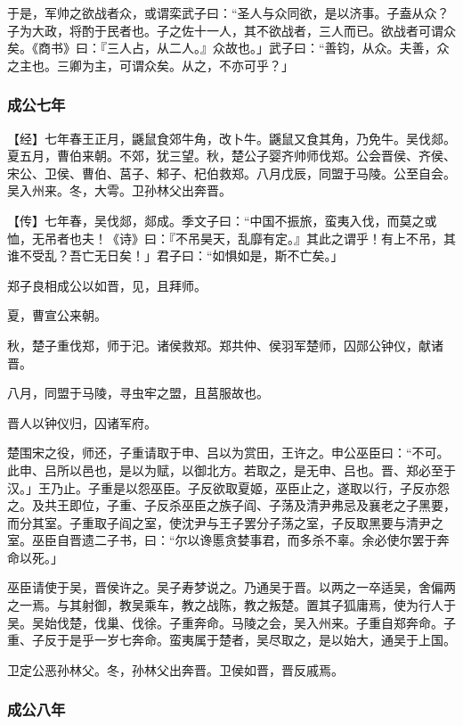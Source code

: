 \documentclass[]{article}
\begin{document}
于是，军帅之欲战者众，或谓栾武子曰：``圣人与众同欲，是以济事。子盍从众？子为大政，将酌于民者也。子之佐十一人，其不欲战者，三人而已。欲战者可谓众矣。《商书》曰：『三人占，从二人。』众故也。」武子曰：``善钧，从众。夫善，众之主也。三卿为主，可谓众矣。从之，不亦可乎？」

\hypertarget{header-n1612}{%
\subsubsection{成公七年 }\label{header-n1612}}

【经】七年春王正月，鼷鼠食郊牛角，改卜牛。鼷鼠又食其角，乃免牛。吴伐郯。夏五月，曹伯来朝。不郊，犹三望。秋，楚公子婴齐帅师伐郑。公会晋侯、齐侯、宋公、卫侯、曹伯、莒子、邾子、杞伯救郑。八月戊辰，同盟于马陵。公至自会。吴入州来。冬，大雩。卫孙林父出奔晋。

【传】七年春，吴伐郯，郯成。季文子曰：``中国不振旅，蛮夷入伐，而莫之或恤，无吊者也夫！《诗》曰：『不吊昊天，乱靡有定。』其此之谓乎！有上不吊，其谁不受乱？吾亡无日矣！」君子曰：``如惧如是，斯不亡矣。」

郑子良相成公以如晋，见，且拜师。

夏，曹宣公来朝。

秋，楚子重伐郑，师于汜。诸侯救郑。郑共仲、侯羽军楚师，囚郧公钟仪，献诸晋。

八月，同盟于马陵，寻虫牢之盟，且莒服故也。

晋人以钟仪归，囚诸军府。

楚围宋之役，师还，子重请取于申、吕以为赏田，王许之。申公巫臣曰：``不可。此申、吕所以邑也，是以为赋，以御北方。若取之，是无申、吕也。晋、郑必至于汉。」王乃止。子重是以怨巫臣。子反欲取夏姬，巫臣止之，遂取以行，子反亦怨之。及共王即位，子重、子反杀巫臣之族子阎、子荡及清尹弗忌及襄老之子黑要，而分其室。子重取子阎之室，使沈尹与王子罢分子荡之室，子反取黑要与清尹之室。巫臣自晋遗二子书，曰：``尔以谗慝贪婪事君，而多杀不辜。余必使尔罢于奔命以死。」

巫臣请使于吴，晋侯许之。吴子寿梦说之。乃通吴于晋。以两之一卒适吴，舍偏两之一焉。与其射御，教吴乘车，教之战陈，教之叛楚。置其子狐庸焉，使为行人于吴。吴始伐楚，伐巢、伐徐。子重奔命。马陵之会，吴入州来。子重自郑奔命。子重、子反于是乎一岁七奔命。蛮夷属于楚者，吴尽取之，是以始大，通吴于上国。

卫定公恶孙林父。冬，孙林父出奔晋。卫侯如晋，晋反戚焉。

\hypertarget{header-n1625}{%
\subsubsection{成公八年}\label{header-n1625}}
\end{document}
